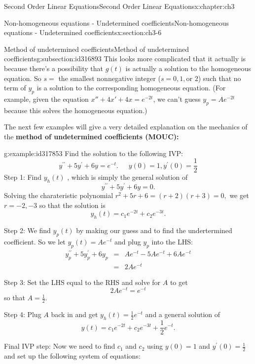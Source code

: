 \documentclass[oneside,10pt,]{book}
\newcommand{\terminology}[1]{\textbf{#1}}
\numberwithin{equation}{section}
\numberwithin{equation}{section}
\newcommand{\amp}{&}
\begin{document}
\begin{chapterptx}{Second Order Linear Equations}{}{Second Order Linear Equations}{}{}{x:chapter:ch3}
\begin{sectionptx}{Non-homogeneous equations - Undetermined coefficients}{}{Non-homogeneous equations - Undetermined coefficients}{}{}{x:section:ch3-6}
\begin{subsectionptx}{Method of undetermined coefficients}{}{Method of undetermined coefficients}{}{}{g:subsection:id316893}
This looks more complicated that it actually is because there's a possibility that \(g(t)\) is actually a solution to the homogeneous equation. So \(s=\) the smallest nonnegative integer (\(s=0,1,\)or \(2\)) such that no term of \(y_{p}\) is a solution to the corresponding homogeneous equation. (For example, given the equation \(x'' + 4x' + 4x = e^{-2t}\), we can't guess \(y_p = A e^{-2t}\) because this solves the homogeneous equation.)%
\par
The next few examples will give a very detailed explanation on the mechanics of the \terminology{method of undetermined coefficients (MOUC):}%
\begin{example}{}{g:example:id317853}%
Find the solution to the following IVP:%
\begin{equation*}
y^{\prime\prime}+5y^{\prime}+6y=e^{-t}.\,\,\,\,\,\,\,\,\,y(0)=1,y^{\prime}(0)=\frac{1}{2}
\end{equation*}
Step 1: Find \(y_{h}(t)\) , which is simply the general solution of%
\begin{equation*}
y^{\prime\prime}+5y^{\prime}+6y=0.
\end{equation*}
Solving the charateristic polynomial \(r^{2}+5r+6=(r+2)(r+3)= 0,\) we get \(r=-2,-3\) so that the solution is%
\begin{equation*}
y_{h}(t)=c_{1}e^{-2t}+c_{2}e^{-3t}.
\end{equation*}
%
\par
Step 2: We find \(y_{p}(t)\) by making our guess and to find the undertermined coefficient. So we let \(y_{p}(t)=Ae^{-t}\) and plug \(y_{p}\) into the LHS:%
\begin{align*}
y_{p}^{\prime\prime}+5y_{p}^{\prime}+6y_{p} \amp = \amp Ae^{-t}-5Ae^{-t}+6Ae^{-t}\\
\amp = \amp 2Ae^{-t}
\end{align*}
%
\par
Step 3: Set the LHS equal to the RHS and solve for \(A\) to get%
\begin{equation*}
2Ae^{-t}=e^{-t}
\end{equation*}
so that \(A=\frac{1}{2}\).%
\par
Step 4: Plug \(A\) back in and get \(y_{h}(t)=\frac{1}{2}e^{-t}\) and a general solution of%
\begin{equation*}
y(t)=c_{1}e^{-2t}+c_{2}e^{-3t}+\frac{1}{2}e^{-t}.
\end{equation*}
%
\par
Final IVP step: Now we need to find \(c_{1}\) and \(c_{2}\) using \(y(0)=1\) and \(y^{\prime}(0)=\frac{1}{2}\) and set up the following system of equations:%

\end{example}
\end{subsectionptx}
\end{sectionptx}
\end{chapterptx}
\end{document}

